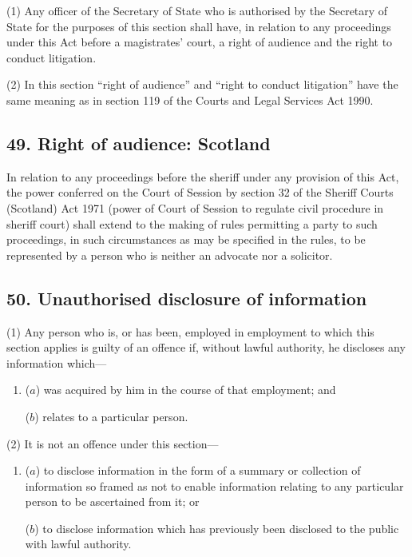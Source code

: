 \documentclass[12pt,a4paper]{article}
\begin{document}
(1) Any 
officer of the Secretary of State who is authorised  %
by the Secretary of State for the purposes of this section shall have, in relation to any proceedings under this Act before a magistrates' court, a right of audience and the right to conduct litigation.

(2) In this section “right of audience” and “right to conduct litigation” have the same meaning as in section 119 of the Courts and Legal Services Act 1990.


\subsection{49. Right of audience: Scotland}

In relation to any proceedings before the sheriff under any provision of this Act, the power conferred on the Court of Session by section 32 of the Sheriff Courts (Scotland) Act 1971 (power of Court of Session to regulate civil procedure in sheriff court) shall extend to the making of rules permitting a party to such proceedings, in such circumstances as may be specified in the rules, to be represented by a person who is neither an advocate nor a solicitor.


\subsection{50. Unauthorised disclosure of information}

(1) Any person who is, or has been, employed in employment to which this section applies is guilty of an offence if, without lawful authority, he discloses any information which—
\begin{enumerate}\item[]
($a$) was acquired by him in the course of that employment; and

($b$) relates to a particular person.
\end{enumerate}

(2) It is not an offence under this section—
\begin{enumerate}\item[]
($a$) to disclose information in the form of a summary or collection of information so framed as not to enable information relating to any particular person to be ascertained from it; or

($b$) to disclose information which has previously been disclosed to the public with lawful authority.
\end{enumerate}
\end{document}
